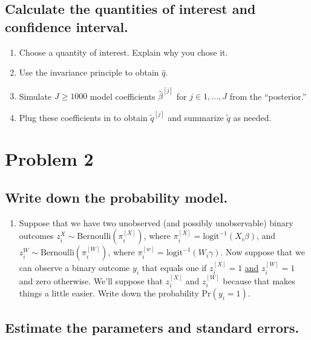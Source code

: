 \documentclass[12pt]{article}
\begin{document}
\subsection*{Calculate the quantities of interest and confidence interval.}

\begin{enumerate}
\item Choose a quantity of interest. Explain why you chose it.
\item Use the invariance principle to obtain $\hat{q}$.
\item Simulate $J \geq 1000$ model coefficients $\hat{\beta}^{[j]}$ for $j \in 1,..., J$ from the ``posterior.''
\item Plug these coefficients in to obtain $\tilde{q}^{[j]}$ and summarize $\tilde{q}$ as needed.
\end{enumerate}

\section*{Problem 2}

\subsection*{Write down the probability model.}

\begin{enumerate}
\item Suppose that we have two unobserved (and possibly unobservable) binary outcomes $z_i^X \sim \text{Bernoulli}(\pi^{[X]}_i)$, where $\pi^{[X]}_i = \text{logit}^{-1}(X_i\beta)$, and $z_i^W \sim \text{Bernoulli}(\pi^{[W]}_i)$, where $\pi^{[w]}_i = \text{logit}^{-1}(W_i\gamma)$. Now suppose that we can observe a binary outcome $y_i$ that equals one if $z_i^{[X]} = 1$ \underline{and} $z_i^{[W]} = 1$ and zero otherwise. We'll suppose that $z_i^{[X]}$ and $z_i^{[W]}$ because that makes things a little easier. Write down the probability $\text{Pr}(y_i = 1)$.
\end{enumerate}

\subsection*{Estimate the parameters and standard errors.}
\end{document}
